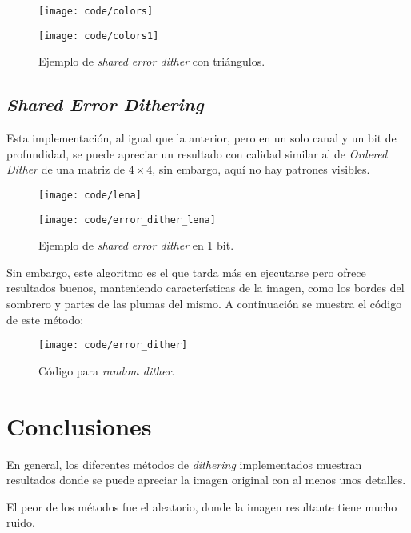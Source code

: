 \documentclass[conference]{IEEEtran}
\begin{document}
\begin{figure}[htbp]
\centerline{\texttt{[image: code/colors]}}
\centerline{\texttt{[image: code/colors1]}}
\caption{Ejemplo de \textit{shared error dither} con triángulos.}
\label{errorColorTriangle}
\end{figure}

\subsection{\textit{Shared Error Dithering}}

Esta implementación, al igual que la anterior, pero en un solo canal y un bit de profundidad, se puede apreciar un resultado con calidad similar al de \textit{Ordered Dither} de una matriz de $4\times 4$, sin embargo, aquí no hay patrones visibles.

\begin{figure}[htbp]
\centerline{\texttt{[image: code/lena]}}
\centerline{\texttt{[image: code/error\_dither\_lena]}}
\caption{Ejemplo de \textit{shared error dither} en 1 bit.}
\label{errorGray}
\end{figure}

Sin embargo, este algoritmo es el que tarda más en ejecutarse pero ofrece resultados buenos, manteniendo características de la imagen, como los bordes del sombrero y partes de las plumas del mismo.
A continuación se muestra el código de este método:

\begin{figure}[htbp]
\centerline{\texttt{[image: code/error\_dither]}}
\caption{Código para \textit{random dither}.}
\label{esrrorPy}
\end{figure}

\section{Conclusiones}

En general, los diferentes métodos de \textit{dithering} implementados muestran resultados donde se puede apreciar la imagen original con al menos unos detalles.

El peor de los métodos fue el aleatorio, donde la imagen resultante tiene mucho ruido.
\end{document}
